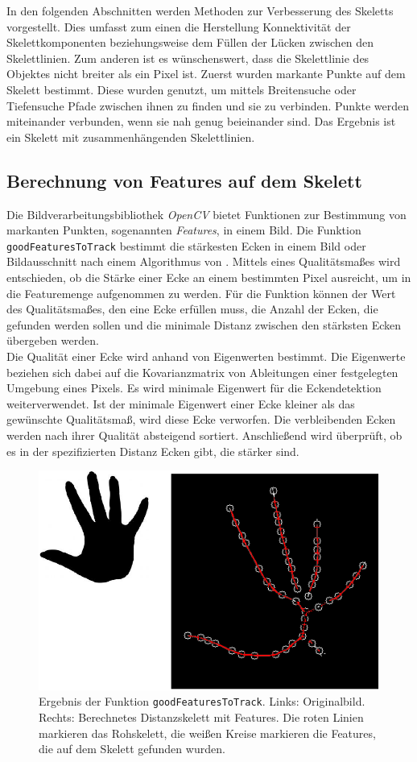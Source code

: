 In den folgenden Abschnitten werden Methoden zur Verbesserung des Skeletts vorgestellt. Dies umfasst zum einen die Herstellung Konnektivität der Skelettkomponenten beziehungsweise dem Füllen der Lücken zwischen den Skelettlinien. Zum anderen ist es wünschenswert, dass die Skelettlinie des Objektes nicht breiter als ein Pixel ist. Zuerst wurden markante Punkte auf dem Skelett bestimmt. Diese wurden
genutzt, um mittels Breitensuche oder Tiefensuche Pfade zwischen ihnen zu finden und sie zu verbinden. Punkte werden miteinander
verbunden, wenn sie nah genug beieinander sind. Das Ergebnis ist ein Skelett mit
zusammenhängenden Skelettlinien. 
\subsection{Berechnung von Features auf dem Skelett}
\label{subsec:features}
Die Bildverarbeitungsbibliothek \emph{OpenCV} bietet Funktionen zur Bestimmung von markanten Punkten, sogenannten \emph{Features},
in einem Bild. Die Funktion \texttt{goodFeaturesToTrack} bestimmt die stärkesten Ecken in einem Bild oder Bildausschnitt nach einem Algorithmus von \cite{goodfeatures}. Mittels eines Qualitätsmaßes wird entschieden, ob die Stärke einer
Ecke an einem bestimmten Pixel ausreicht, um in die Featuremenge aufgenommen zu werden. Für die
Funktion können der Wert des Qualitätsmaßes, den eine Ecke erfüllen muss, die Anzahl der Ecken, die gefunden werden sollen und die
minimale Distanz zwischen den stärksten Ecken übergeben werden.\\
Die Qualität einer Ecke wird anhand von Eigenwerten bestimmt. Die Eigenwerte beziehen sich dabei auf 
die Kovarianzmatrix von Ableitungen einer festgelegten Umgebung eines Pixels. Es wird minimale Eigenwert
für die Eckendetektion weiterverwendet. Ist der minimale Eigenwert einer Ecke kleiner als das gewünschte
Qualitätsmaß, wird diese Ecke verworfen. Die verbleibenden Ecken werden nach ihrer Qualität absteigend sortiert. Anschließend wird überprüft, ob es in der spezifizierten Distanz Ecken gibt, die stärker sind. 
\begin{figure}[htbp]
\centering
\includegraphics[width=0.7\linewidth]{./fig/features.pdf}
\caption{Ergebnis der Funktion \texttt{goodFeaturesToTrack}. Links: Originalbild. Rechts: Berechnetes Distanzskelett mit Features. Die roten Linien markieren das Rohskelett, die weißen Kreise markieren die Features, die auf dem Skelett gefunden wurden.}
\label{fig:features}
\end{figure}
